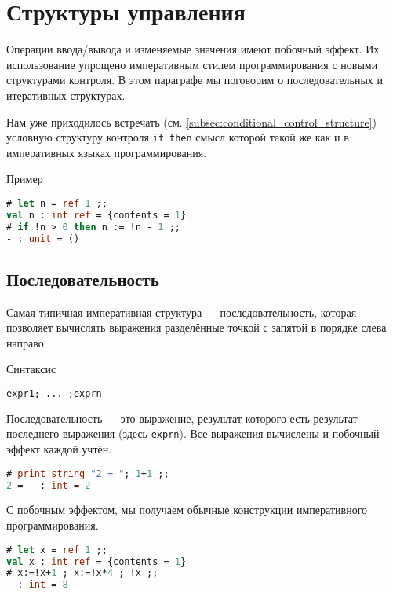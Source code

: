 \section{Структуры управления}
\label{sec:control _structures}

Операции ввода/вывода и изменяемые значения имеют побочный эффект. Их
использование упрощено императивным стилем программирования с новыми структурами
контроля. В этом параграфе мы поговорим о последовательных и итеративных
структурах.

Нам уже приходилось встречать (см. \ref{subsec:conditional_control_structure})
условную структуру контроля \texttt{if then} смысл которой такой же как и в
императивных языках программирования.

Пример

\begin{lstlisting}[language=OCaml]
# let n = ref 1 ;;
val n : int ref = {contents = 1}
# if !n > 0 then n := !n - 1 ;;
- : unit = ()
\end{lstlisting}

\subsection{Последовательность}
\label{subsec:sequence}

Самая типичная императивная структура --- последовательность, которая позволяет
вычислять выражения разделённые точкой с запятой в порядке слева направо.

Синтаксис

\begin{lstlisting}[language=OCaml]
expr1; ... ;exprn
\end{lstlisting}

Последовательность --- это выражение, результат которого есть результат
последнего выражения (здесь \texttt{exprn}). Все выражения вычислены и побочный
эффект каждой учтён.

\begin{lstlisting}[language=OCaml]
# print_string "2 = "; 1+1 ;;
2 = - : int = 2
\end{lstlisting}

С побочным эффектом, мы получаем обычные конструкции императивного
программирования.

\begin{lstlisting}[language=OCaml]
# let x = ref 1 ;;
val x : int ref = {contents = 1}
# x:=!x+1 ; x:=!x*4 ; !x ;;
- : int = 8
\end{lstlisting}

